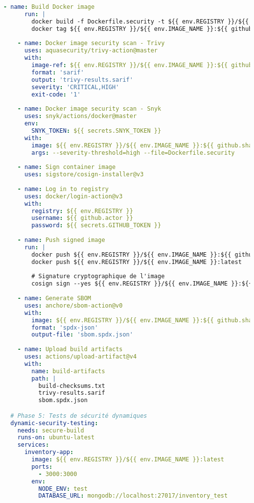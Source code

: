\documentclass[12pt,a4paper]{report}
\begin{document}
\begin{lstlisting}[language=YAML, caption=Pipeline GitHub Actions DevSecOps complète]
    - name: Build Docker image
      run: |
        docker build -f Dockerfile.security -t ${{ env.REGISTRY }}/${{ env.IMAGE_NAME }}:${{ github.sha }} .
        docker tag ${{ env.REGISTRY }}/${{ env.IMAGE_NAME }}:${{ github.sha }} ${{ env.REGISTRY }}/${{ env.IMAGE_NAME }}:latest
    
    - name: Docker image security scan - Trivy
      uses: aquasecurity/trivy-action@master
      with:
        image-ref: ${{ env.REGISTRY }}/${{ env.IMAGE_NAME }}:${{ github.sha }}
        format: 'sarif'
        output: 'trivy-results.sarif'
        severity: 'CRITICAL,HIGH'
        exit-code: '1'
    
    - name: Docker image security scan - Snyk
      uses: snyk/actions/docker@master
      env:
        SNYK_TOKEN: ${{ secrets.SNYK_TOKEN }}
      with:
        image: ${{ env.REGISTRY }}/${{ env.IMAGE_NAME }}:${{ github.sha }}
        args: --severity-threshold=high --file=Dockerfile.security
    
    - name: Sign container image
      uses: sigstore/cosign-installer@v3
    
    - name: Log in to registry
      uses: docker/login-action@v3
      with:
        registry: ${{ env.REGISTRY }}
        username: ${{ github.actor }}
        password: ${{ secrets.GITHUB_TOKEN }}
    
    - name: Push signed image
      run: |
        docker push ${{ env.REGISTRY }}/${{ env.IMAGE_NAME }}:${{ github.sha }}
        docker push ${{ env.REGISTRY }}/${{ env.IMAGE_NAME }}:latest
        
        # Signature cryptographique de l'image
        cosign sign --yes ${{ env.REGISTRY }}/${{ env.IMAGE_NAME }}:${{ github.sha }}
    
    - name: Generate SBOM
      uses: anchore/sbom-action@v0
      with:
        image: ${{ env.REGISTRY }}/${{ env.IMAGE_NAME }}:${{ github.sha }}
        format: 'spdx-json'
        output-file: 'sbom.spdx.json'
    
    - name: Upload build artifacts
      uses: actions/upload-artifact@v4
      with:
        name: build-artifacts
        path: |
          build-checksums.txt
          trivy-results.sarif
          sbom.spdx.json

  # Phase 5: Tests de sécurité dynamiques
  dynamic-security-testing:
    needs: secure-build
    runs-on: ubuntu-latest
    services:
      inventory-app:
        image: ${{ env.REGISTRY }}/${{ env.IMAGE_NAME }}:latest
        ports:
          - 3000:3000
        env:
          NODE_ENV: test
          DATABASE_URL: mongodb://localhost:27017/inventory_test
      

\end{lstlisting}
\end{document}
